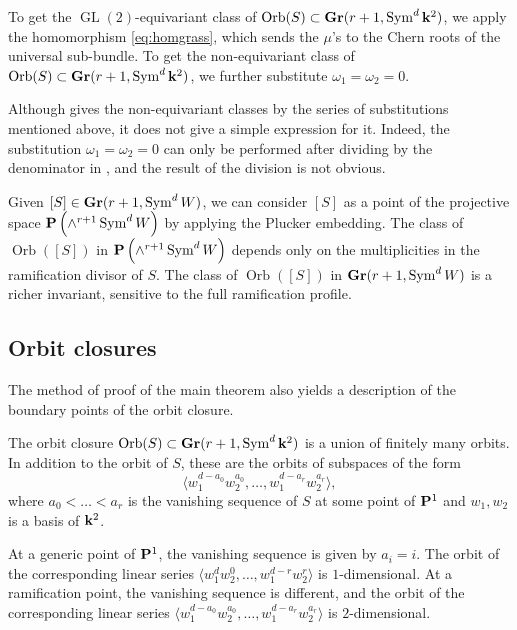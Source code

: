 \documentclass[11pt]{amsart}
\renewcommand {\P}{{\bf P}}
\providecommand {\Gr}{{\bf Gr}}
\providecommand{\GL}{\operatorname{GL}}
\providecommand{\Sym}{\operatorname{Sym}}
\DeclareMathOperator{\Orb}{Orb}
\begin{document}
To get the \(\GL(2)\)-equivariant class of \(\Orb(S) \subset \Gr(r+1, \Sym^d\k^2)\), we apply the homomorphism \eqref{eq:homgrass}, which sends the \(\mu\)'s to the Chern roots of the universal sub-bundle.
To get the non-equivariant class of \(\Orb(S) \subset \Gr(r+1, \Sym^d\k^2)\), we further substitute \(\omega_1 = \omega_2 = 0\).

\begin{remark}
  Although  gives the non-equivariant classes by the series of substitutions mentioned above, it does not give a simple expression for it.
  Indeed, the substitution \(\omega_1 = \omega_2 = 0\) can only be performed after dividing by the denominator in , and the result of the division is not obvious.
\end{remark}
\begin{remark}
  Given \([S] \in \Gr(r+1, \Sym^d W)\), we can consider \([S]\) as a point of the projective space \(\P \left(\wedge^{r+1} \Sym^d W\right)\) by applying the Plucker embedding.
  The class of \(\Orb([S])\) in \(\P \left(\wedge^{r+1} \Sym^d W\right)\) depends only on the multiplicities in the ramification divisor of \(S\).
  The class of \(\Orb([S])\) in \(\Gr(r+1, \Sym^d W)\) is a richer invariant, sensitive to the full ramification profile.
\end{remark}

\subsection{Orbit closures}
The method of proof of the main theorem also yields a description of the boundary points of the orbit closure.
\begin{theorem}\label{thm:closure}
  The orbit closure \(\Orb(S) \subset \Gr(r+1, \Sym^d\k^2)\) is a union of finitely many orbits.
  In addition to the orbit of \(S\), these are the orbits of subspaces of the form
  \[\langle w_1^{d-a_0}w_2^{a_0}, \dots, w_1^{d-a_r}w_2^{a_r} \rangle,\]
  where \(a_0 < \dots < a_r\) is the vanishing sequence of \(S\) at some point of \(\P^1\) and \(w_1, w_2\) is a basis of \(\mathbf k^2\).
\end{theorem}
At a generic point of \(\P^1\), the vanishing sequence is given by \(a_i = i\).
The orbit of the corresponding linear series \(\langle  w_1^{d}w_2^0, \dots, w_1^{d-r}w_2^r \rangle\) is \(1\)-dimensional.
At a ramification point, the vanishing sequence is different, and the orbit of the corresponding linear series \(\langle  w_1^{d-a_0}w_2^{a_0}, \dots, w_1^{d-a_r}w_2^{a_r} \rangle\) is \(2\)-dimensional.
\end{document}
